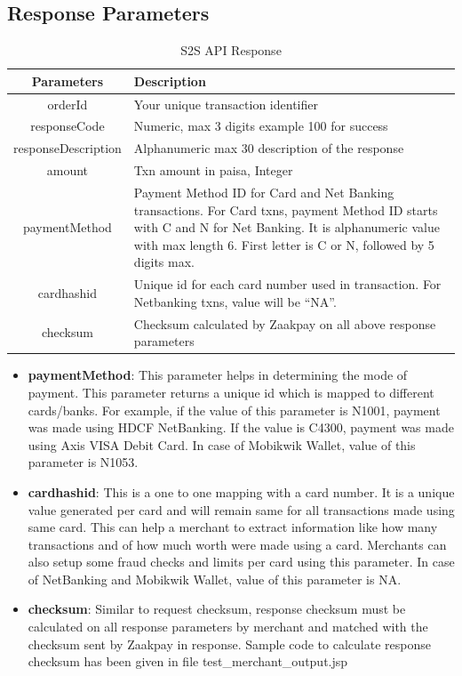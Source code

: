 \documentclass{article}
\begin{document}
\subsection{Response Parameters}

\begin{longtable}{||c|p{12.5cm}||}
       \caption{S2S API Response}\\
   \rowcolor{green!50}
\bfseries{Parameters} & \bfseries{Description} \\ \hline
orderId & Your unique transaction identifier \\
responseCode & Numeric, max 3 digits example 100 for success\\
responseDescription & Alphanumeric max 30 description of the response\\
amount & Txn amount in paisa, Integer \\
paymentMethod & Payment Method ID for Card and Net Banking transactions. For Card txns, payment Method ID starts with C and N for Net Banking. It is alphanumeric value with max length 6. First letter is C or N, followed by 5 digits max.\\
cardhashid & Unique id for each card number used in transaction. For Netbanking txns, value will be “NA”.\\
checksum & Checksum calculated by Zaakpay on all above response
parameters


\end{longtable}
\begin{itemize}
\item {\bfseries paymentMethod}: This parameter helps in determining the mode of payment. This parameter returns a unique id which is mapped to different cards/banks. For example, if the value of this parameter is N1001, payment was made using HDCF NetBanking. If the value is C4300, payment was made using Axis VISA Debit Card.
In case of Mobikwik Wallet, value of this parameter is N1053.
\item {\bfseries cardhashid}: This is a one to one mapping with a card number. It is a unique value generated per card and will remain same for all transactions made using same card. This can help a merchant to extract information like how many transactions and of how much worth were made using a card.  Merchants can also setup some fraud checks and limits per  card using this parameter. In case of NetBanking and Mobikwik Wallet, value of this parameter is NA. 
\item {\bfseries checksum}: Similar to request checksum, response checksum must be calculated on all response parameters by merchant and matched with the checksum sent by Zaakpay in response. Sample code to calculate response checksum has been given in file test\_merchant\_output.jsp
\end{itemize}
\end{document}
